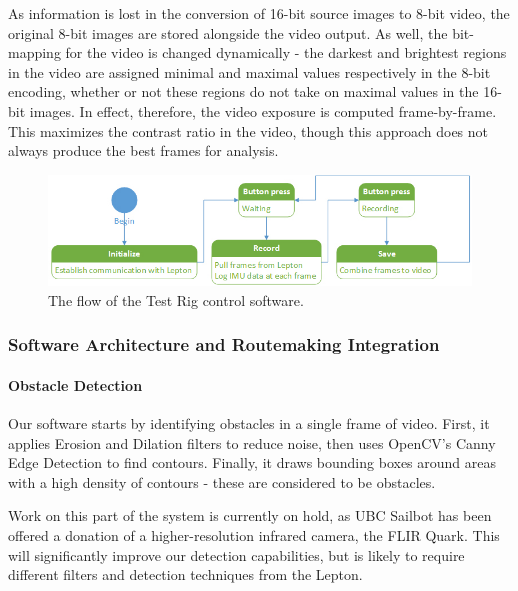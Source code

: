 As information is lost in the conversion of 16-bit source images to 8-bit video, the original 8-bit images are stored alongside the video output. As well, the bit-mapping for the video is changed dynamically - the darkest and brightest regions in the video are assigned minimal and maximal values respectively in the 8-bit encoding, whether or not these regions do not take on maximal values in the 16-bit images. In effect, therefore, the video exposure is computed frame-by-frame. This maximizes the contrast ratio in the video, though this approach does not always produce the best frames for analysis.

\begin{figure}
\centering
\includegraphics[width=\linewidth]{"./image/button_py"}
\caption[Test Rig software flow]{\label{fig:test-rig-software}The flow of the Test Rig control software.}
\end{figure}

\subsubsection{\label{sec:discussion:equipment:architecture}Software Architecture and Routemaking Integration}

\paragraph{\label{sec:discussion:equipment:architecture:obstacledetection}Obstacle Detection}
Our software starts by identifying obstacles in a single frame of video.  First, it applies Erosion and Dilation filters to reduce noise, then uses OpenCV's Canny Edge Detection to find contours.  Finally, it draws bounding boxes around areas with a high density of contours - these are considered to be obstacles.

Work on this part of the system is currently on hold, as UBC Sailbot has been offered a donation of a higher-resolution infrared camera, the FLIR Quark.  This will significantly improve our detection capabilities, but is likely to require different filters and detection techniques from the Lepton.

